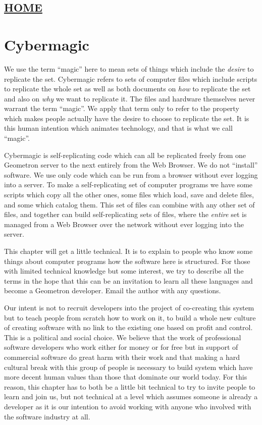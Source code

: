 \hypertarget{home}{%
\subsection{\texorpdfstring{\href{scrolls/home}{HOME}}{HOME}}\label{home}}

\hypertarget{cybermagic}{%
\section{Cybermagic}\label{cybermagic}}

We use the term ``magic'' here to mean sets of things which include the
\emph{desire} to replicate the set. Cybermagic refers to sets of
computer files which include scripts to replicate the whole set as well
as both documents on \emph{how} to replicate the set and also on
\emph{why} we want to replicate it. The files and hardware themselves
never warrant the term ``magic''. We apply that term only to refer to
the property which makes people actually have the desire to choose to
replicate the set. It is this human intention which animates technology,
and that is what we call ``magic''.

Cybermagic is self-replicating code which can all be replicated freely
from one Geometron server to the next entirely from the Web Browser. We
do not ``install'' software. We use only code which can be run from a
browser without ever logging into a server. To make a self-replicating
set of computer programs we have some scripts which copy all the other
ones, some files which load, save and delete files, and some which
catalog them. This set of files can combine with any other set of files,
and together can build self-replicating sets of files, where the
\emph{entire} set is managed from a Web Browser over the network without
ever logging into the server.

This chapter will get a little technical. It is to explain to people who
know some things about computer programs how the software here is
structured. For those with limited technical knowledge but some
interest, we try to describe all the terms in the hope that this can be
an invitation to learn all these languages and become a Geometron
developer. Email the author with any questions.

Our intent is not to recruit developers into the project of co-creating
this system but to teach people from scratch how to work on it, to build
a whole new culture of creating software with no link to the existing
one based on profit and control. This is a political and social choice.
We believe that the work of professional software developers who work
either for money or for free but in support of commercial software do
great harm with their work and that making a hard cultural break with
this group of people is necessary to build system which have more decent
human values than those that dominate our world today. For this reason,
this chapter has to both be a little bit technical to try to invite
people to learn and join us, but not technical at a level which assumes
someone is already a developer as it is our intention to avoid working
with anyone who involved with the software industry at all.

